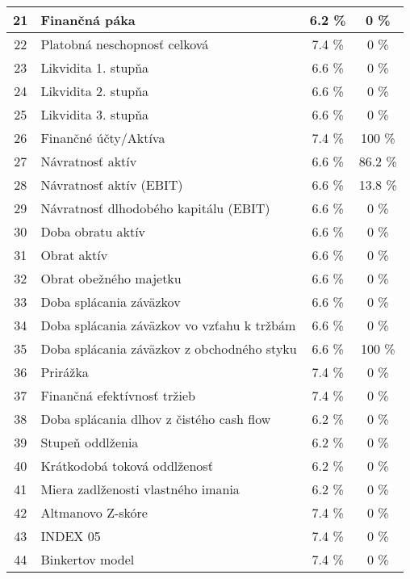 \begin{longtable}{ |c|p{7cm}|c|c| }
        \hline
        21 & Finančná páka & 6.2 \% & 0 \% \\
        \hline
        22 & Platobná neschopnosť celková & 7.4 \% & 0 \% \\
        \hline
        23 & Likvidita 1. stupňa & 6.6 \% & 0 \% \\
        \hline
        24 & Likvidita 2. stupňa & 6.6 \% & 0 \% \\
        \hline
        25 & Likvidita 3. stupňa & 6.6 \% & 0 \% \\
        \hline
        26 & Finančné účty/Aktíva & 7.4 \% & 100 \% \\
        \hline
        27 & Návratnosť aktív & 6.6 \% & 86.2 \% \\
        \hline
        28 & Návratnosť aktív (EBIT) & 6.6 \% & 13.8 \% \\
        \hline
        29 & Návratnosť dlhodobého kapitálu (EBIT) & 6.6 \% & 0 \% \\
        \hline
        30 & Doba obratu aktív & 6.6 \% & 0 \% \\
        \hline
        31 & Obrat aktív & 6.6 \% & 0 \% \\
        \hline
        32 & Obrat obežného majetku & 6.6 \% & 0 \% \\
        \hline
        33 & Doba splácania záväzkov & 6.6 \% & 0 \% \\
        \hline
        34 & Doba splácania záväzkov vo vzťahu k tržbám & 6.6 \% & 0 \% \\
        \hline
        35 & Doba splácania záväzkov z obchodného styku & 6.6 \% & 100 \% \\
        \hline
        36 & Prirážka & 7.4 \% & 0 \% \\
        \hline
        37 & Finančná efektívnosť tržieb & 7.4 \% & 0 \% \\
        \hline
        38 & Doba splácania dlhov z čistého cash flow & 6.2 \% & 0 \% \\
        \hline
        39 & Stupeň oddlženia & 6.2 \% & 0 \% \\
        \hline
        40 & Krátkodobá toková oddlženosť & 6.2 \% & 0 \% \\
        \hline
        41 & Miera zadlženosti vlastného imania & 6.2 \% & 0 \% \\
        \hline
        42 & Altmanovo Z-skóre & 7.4 \% & 0 \% \\
        \hline
        43 & INDEX 05 & 7.4 \% & 0 \% \\
        \hline
        44 & Binkertov model & 7.4 \% & 0 \% \\

\end{longtable}
